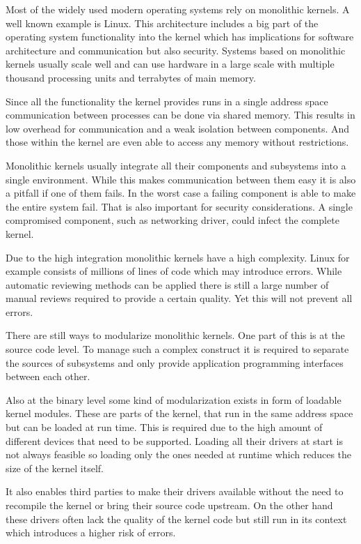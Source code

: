 \documentclass[
a4paper,
12pt,
notitlepage,
parskip=half,
DIV=11,
]{scrbook}
\begin{document}
		Most of the widely used modern operating systems rely on monolithic kernels.
		A well known example is Linux.
		This architecture includes a big part of the operating system functionality into the kernel which has implications for software architecture and communication but also security.
		Systems based on monolithic kernels usually scale well and can use hardware in a large scale with multiple thousand processing units and terrabytes of main memory.
		
		Since all the functionality the kernel provides runs in a single address space communication between processes can be done via shared memory.
		This results in low overhead for communication and a weak isolation between components.
		And those within the kernel are even able to access any memory without restrictions.
		
		Monolithic kernels usually integrate all their components and subsystems into a single environment.
		While this makes communication between them easy it is also a pitfall if one of them fails.
		In the worst case a failing component is able to make the entire system fail.
		That is also important for security considerations.
		A single compromised component, such as networking driver, could infect the complete kernel.
		
		Due to the high integration monolithic kernels have a high complexity.
		Linux for example consists of millions of lines of code which may introduce errors.
		While automatic reviewing methods can be applied there is still a large number of manual reviews required to provide a certain quality.
		Yet this will not prevent all errors.
		
		There are still ways to modularize monolithic kernels.
		One part of this is at the source code level.
		To manage such a complex construct it is required to separate the sources of subsystems and only provide application programming interfaces between each other.
		
		Also at the binary level some kind of modularization exists in form of loadable kernel modules.
		These are parts of the kernel, that run in the same address space but can be loaded at run time.
		This is required due to the high amount of different devices that need to be supported.
		Loading all their drivers at start is not always feasible so loading only the ones needed at runtime which reduces the size of the kernel itself.
		
		It also enables third parties to make their drivers available without the need to recompile the kernel or bring their source code upstream.
		On the other hand these drivers often lack the quality of the kernel code but still run in its context which introduces a higher risk of errors. \citep{Lameter07}
		
\end{document}
